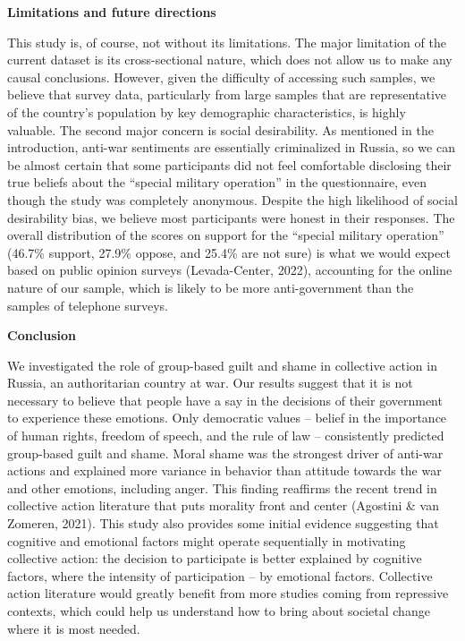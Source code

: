 \documentclass[
]{article}
\begin{document}
\textbf{Limitations and future directions}

This study is, of course, not without its limitations. The major limitation of the current dataset is its cross-sectional nature, which does not allow us to make any causal conclusions. However, given the difficulty of accessing such samples, we believe that survey data, particularly from large samples that are representative of the country's population by key demographic characteristics, is highly valuable. The second major concern is social desirability. As mentioned in the introduction, anti-war sentiments are essentially criminalized in Russia, so we can be almost certain that some participants did not feel comfortable disclosing their true beliefs about the ``special military operation'' in the questionnaire, even though the study was completely anonymous. Despite the high likelihood of social desirability bias, we believe most participants were honest in their responses. The overall distribution of the scores on support for the ``special military operation'' (46.7\% support, 27.9\% oppose, and 25.4\% are not sure) is what we would expect based on public opinion surveys (Levada-Center, 2022), accounting for the online nature of our sample, which is likely to be more anti-government than the samples of telephone surveys.

\textbf{Conclusion}

We investigated the role of group-based guilt and shame in collective action in Russia, an authoritarian country at war. Our results suggest that it is not necessary to believe that people have a say in the decisions of their government to experience these emotions. Only democratic values -- belief in the importance of human rights, freedom of speech, and the rule of law -- consistently predicted group-based guilt and shame. Moral shame was the strongest driver of anti-war actions and explained more variance in behavior than attitude towards the war and other emotions, including anger. This finding reaffirms the recent trend in collective action literature that puts morality front and center (Agostini \& van Zomeren, 2021). This study also provides some initial evidence suggesting that cognitive and emotional factors might operate sequentially in motivating collective action: the decision to participate is better explained by cognitive factors, where the intensity of participation -- by emotional factors. Collective action literature would greatly benefit from more studies coming from repressive contexts, which could help us understand how to bring about societal change where it is most needed.
\end{document}
